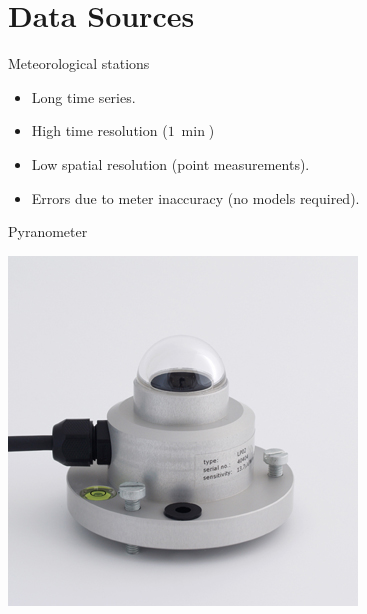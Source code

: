 \documentclass[xcolor={usenames,svgnames,dvipsnames}]{beamer}
\begin{document}
\section{Data Sources}
\label{sec:org42d7db7}
\begin{frame}[label={sec:org1b7a437}]{Meteorological stations}
\begin{itemize}
\item Long time series.
\item High time resolution (\(\SI{1}{\min}\))
\item Low spatial resolution (point measurements).
\item Errors due to meter inaccuracy (no models required).
\end{itemize}

\begin{block}{Pyranometer}
\begin{center}
\includegraphics[height=0.5\textheight]{../figs/piranometro.jpg}
\end{center}
\end{block}
\end{frame}
\end{document}
